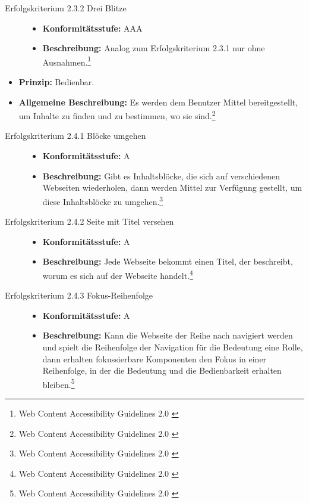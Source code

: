 \begin{description}
\begin{description}
		\item[Erfolgskriterium 2.3.2 Drei Blitze]\hfill
		\begin{itemize}
			\item \textbf{Konformitätsstufe:} AAA
			\item \textbf{Beschreibung:} Analog zum Erfolgskriterium 2.3.1 nur ohne Ausnahmen.\footnote{Web Content Accessibility Guidelines 2.0 \cite{WCAG2.0}}
		\end{itemize}
	\end{description}
	
	\item[Richtlinie 2.4 Navigierbar]\hfill
	\begin{itemize}
		\item \textbf{Prinzip:} Bedienbar.
		\item \textbf{Allgemeine Beschreibung:} Es werden dem Benutzer Mittel bereitgestellt, um Inhalte zu finden und zu bestimmen, wo sie 
		sind.\footnote{Web Content Accessibility Guidelines 2.0 \cite{WCAG2.0}}
	\end{itemize}
	
	\begin{description}
		\item[Erfolgskriterium 2.4.1 Blöcke umgehen]\hfill
		\begin{itemize}
			\item \textbf{Konformitätsstufe:} A
			\item \textbf{Beschreibung:} Gibt es Inhaltsblöcke, die sich auf verschiedenen Webseiten wiederholen, dann werden Mittel zur Verfügung 
			gestellt, um diese Inhaltsblöcke zu umgehen.\footnote{Web Content Accessibility Guidelines 2.0 \cite{WCAG2.0}}	
		\end{itemize}
		
		\item[Erfolgskriterium 2.4.2 Seite mit Titel versehen]\hfill
		\begin{itemize}
			\item \textbf{Konformitätsstufe:} A
			\item \textbf{Beschreibung:} Jede Webseite bekommt einen Titel, der beschreibt, worum es sich auf der Webseite 
			handelt.\footnote{Web Content Accessibility Guidelines 2.0 \cite{WCAG2.0}}
		\end{itemize}
		
		\item[Erfolgskriterium 2.4.3 Fokus-Reihenfolge]\hfill
		\begin{itemize}
			\item \textbf{Konformitätsstufe:} A
			\item \textbf{Beschreibung:} Kann die Webseite der Reihe nach navigiert werden und spielt die Reihenfolge der Navigation für die Bedeutung eine 
			Rolle, dann erhalten fokussierbare Komponenten den Fokus in einer Reihenfolge, in der die Bedeutung und die Bedienbarkeit erhalten 
			bleiben.\footnote{Web Content Accessibility Guidelines 2.0 \cite{WCAG2.0}}
		\end{itemize}
		

\end{description}
\end{description}
